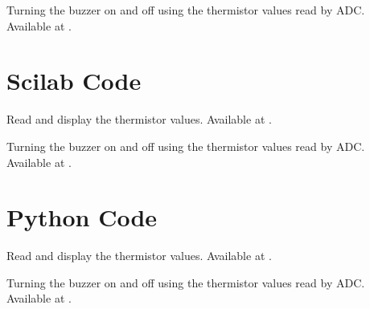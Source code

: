 \begin{ardcode}
  {Turning the buzzer on and off using the thermistor values read by
    ADC.  Available at
    .}
\label{ard:therm-buzzer}

\end{ardcode}


\section{Scilab Code}
\label{sec:therm-scilab-code}

\begin{scicode}
   {Read and display
    the thermistor values.  Available at
    .}
\label{sci:therm-read}

\end{scicode}

\begin{scicode}
  {Turning the buzzer on and off using the thermistor values read by
    ADC.  Available at .}
\label{sci:therm-buzzer}

\end{scicode}

\section{Python Code}
\label{sec:therm-pyhton-code}

\begin{pycode}
   {Read and display
    the thermistor values.  Available at
    .}
\label{py:therm-read}

\end{pycode}

\begin{pycode}
  {Turning the buzzer on and off using the thermistor values read by
    ADC.  Available at .}
\label{py:therm-buzzer}

\end{pycode}

